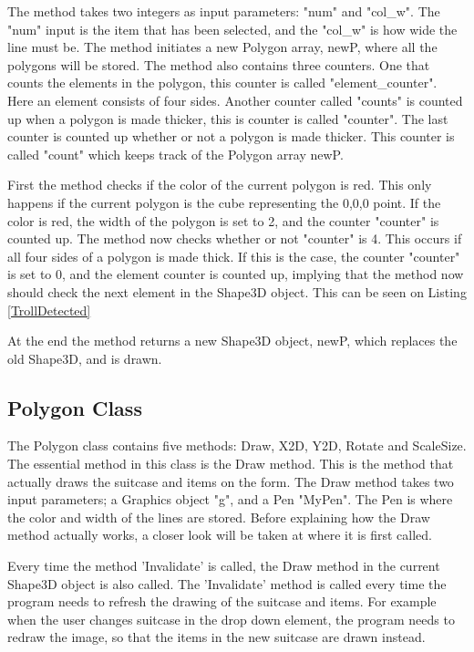 The method takes two integers as input parameters: "num" and "col\_w". The "num" input is the item that has been selected, and the "col\_w" is how wide the line must be. The method initiates a new Polygon array, newP, where all the polygons will be stored. The method also contains three counters. One that counts the elements in the polygon, this counter is called "element\_counter". Here an element consists of four sides. Another counter called "counts" is counted up when a polygon is made thicker, this is counter is called "counter". The last counter is counted up whether or not a polygon is made thicker. This counter is called "count" which keeps track of the Polygon array newP.

First the method checks if the color of the current polygon is red. This only happens if the current polygon is the cube representing the 0,0,0 point. If the color is red, the width of the polygon is set to 2, and the counter "counter" is counted up. The method now checks whether or not "counter" is 4. This occurs if all four sides of a polygon is made thick. If this is the case, the counter "counter" is set to 0, and the element counter is counted up, implying that the method now should check the next element in the Shape3D object. This can be seen on Listing \ref{TrollDetected}


At the end the method returns a new Shape3D object, newP, which replaces the old Shape3D, and is drawn.

\subsection{Polygon Class} 
The Polygon class contains five methods: Draw, X2D, Y2D, Rotate and ScaleSize. The essential method in this class is the Draw method. This is the method that actually draws the suitcase and items on the form. The Draw method takes two input parameters; a Graphics object "g", and a Pen "MyPen". The Pen is where the color and width of the lines are stored. Before explaining how the Draw method actually works, a closer look will be taken at where it is first called.

Every time the method 'Invalidate' is called, the Draw method in the current Shape3D object is also called. The 'Invalidate' method is called every time the program needs to refresh the drawing of the suitcase and items. For example when the user changes suitcase in the drop down element, the program needs to redraw the image, so that the items in the new suitcase are drawn instead. 

